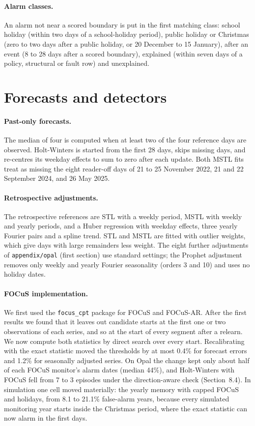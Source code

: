 \paragraph{Alarm classes.} An alarm not near a scored boundary is put in the first matching class: school holiday (within two days of a school-holiday period), public holiday or Christmas (zero to two days after a public holiday, or 20 December to 15 January), after an event (8 to 28 days after a scored boundary), explained (within seven days of a policy, structural or fault row) and unexplained.

\section{Forecasts and detectors}\label{app:d-methods}

\paragraph{Past-only forecasts.} The median of four is computed when at least two of the four reference days are observed. Holt-Winters is started from the first 28 days, skips missing days, and re-centres its weekday effects to sum to zero after each update. Both MSTL fits treat as missing the eight reader-off days of 21 to 25 November 2022, 21 and 22 September 2024, and 26 May 2025.

\paragraph{Retrospective adjustments.} The retrospective references are STL \citep{cleveland1990} with a weekly period, MSTL \citep{bandara2025} with weekly and yearly periods, and a Huber regression with weekday effects, three yearly Fourier pairs and a spline trend. STL and MSTL are fitted with outlier weights, which give days with large remainders less weight. The eight further adjustments of \texttt{appendix/opal} (first section) use standard settings; the Prophet adjustment removes only weekly and yearly Fourier seasonality (orders 3 and 10) and uses no holiday dates.

\paragraph{FOCuS implementation.} We first used the \texttt{focus\_cpt} package for FOCuS and FOCuS-AR. After the first results we found that it leaves out candidate starts at the first one or two observations of each series, and so at the start of every segment after a relearn. We now compute both statistics by direct search over every start. Recalibrating with the exact statistic moved the thresholds by at most 0.4\% for forecast errors and 1.2\% for seasonally adjusted series. On Opal the change kept only about half of each FOCuS monitor's alarm dates (median 44\%), and Holt-Winters with FOCuS fell from 7 to 3 episodes under the direction-aware check (Section~8.4). In simulation one cell moved materially: the yearly memory with capped FOCuS and holidays, from 8.1 to 21.1\% false-alarm years, because every simulated monitoring year starts inside the Christmas period, where the exact statistic can now alarm in the first days.

